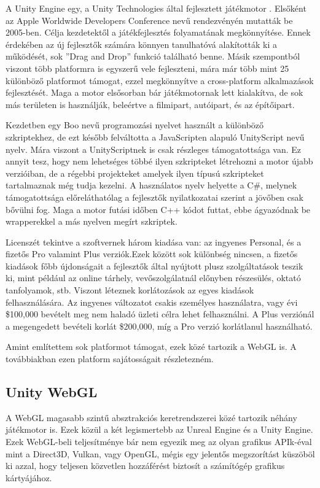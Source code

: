 
A Unity Engine egy, a Unity Technologies által fejlesztett játékmotor \cite{unity}. Elsőként az Apple Worldwide Developers Conference nevű rendezvényén mutatták be 2005-ben. Célja kezdetektől a játékfejlesztés folyamatának megkönnyítése. Ennek érdekében az új fejlesztők számára könnyen tanulhatóvá alakították ki a működését, sok ''Drag and Drop'' funkció található benne. Másik szempontból viszont több platformra is egyszerű vele fejleszteni, mára már több mint 25 különböző platformot támogat, ezzel megkönnyítve a cross-platform alkalmazások fejlesztését. Maga a motor elsősorban bár játékmotornak lett kialakítva, de sok más területen is használják, beleértve a filmipart, autóipart, és az építőipart.

Kezdetben egy Boo nevű programozási nyelvet használt a különböző szkriptekhez, de ezt később felváltotta a JavaScripten alapuló UnityScript nevű nyelv. Mára viszont a UnityScriptnek is csak részleges támogatottsága van. Ez annyit tesz, hogy nem lehetséges többé ilyen szkripteket létrehozni a motor újabb verzióiban, de a régebbi projekteket amelyek ilyen típusú szkripteket tartalmaznak még tudja kezelni. A használatos nyelv helyette a C\#, melynek támogatottsága előreláthatólag a fejlesztők nyilatkozatai szerint a jövőben csak bővülni fog. Maga a motor futási időben C++ kódot futtat, ebbe ágyazódnak be wrapperekkel a más nyelven megírt szkriptek.

Licenszét tekintve a szoftvernek három kiadása van: az ingyenes Personal, és a fizetős Pro valamint Plus verziók.Ezek között sok különbség nincsen, a fizetős kiadások főbb újdonságait a fejlesztők által nyújtott plusz szolgáltatások teszik ki, mint például az online tárhely, vevőszolgálatnál előnyben részesülés, oktató tanfolyamok, stb. Viszont léteznek korlátozások az egyes kiadások felhasználására. Az ingyenes változatot csakis személyes használatra, vagy évi \$100,000 bevételt meg nem haladó üzleti célra lehet felhasználni. A Plus verziónál a megengedett bevételi korlát \$200,000, míg a Pro verzió korlátlanul használható.

Amint említettem sok platformot támogat, ezek közé tartozik a WebGL is. A továbbiakban ezen platform sajátosságait részletezném.
\subsection{Unity WebGL}
A WebGL magasabb szintű absztrakciós keretrendszerei közé tartozik néhány játékmotor is. Ezek közül a két legismertebb az Unreal Engine és a Unity Engine. Ezek WebGL-beli teljesítménye bár nem egyezik meg az olyan grafikus APIk-éval mint a Direct3D, Vulkan, vagy OpenGL, mégis egy jelentős megszorítást küszöböl ki azzal, hogy teljesen közvetlen hozzáférést biztosít a számítógép grafikus kártyájához.

